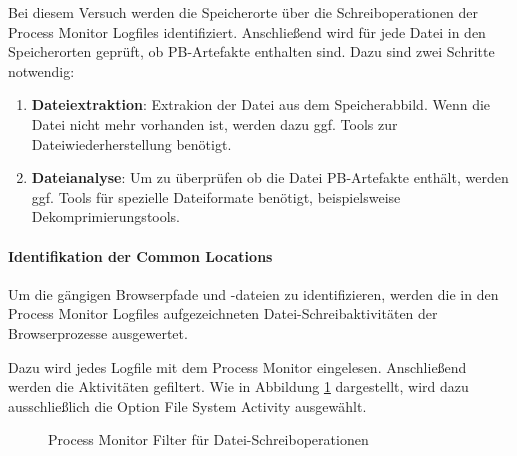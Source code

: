 Bei diesem Versuch werden die Speicherorte über die Schreiboperationen der Process Monitor Logfiles identifiziert.
Anschließend wird für jede Datei in den Speicherorten geprüft, ob PB-Artefakte enthalten sind.
Dazu sind zwei Schritte notwendig:
\begin{enumerate}
\item \textbf{Dateiextraktion}: Extrakion der Datei aus dem Speicherabbild. Wenn die Datei nicht mehr vorhanden ist, werden dazu ggf. Tools zur Dateiwiederherstellung benötigt.
\item \textbf{Dateianalyse}: Um zu überprüfen ob die Datei PB-Artefakte enthält, werden ggf. Tools für spezielle Dateiformate benötigt, beispielsweise Dekomprimierungstools.
\end{enumerate}

\paragraph*{Identifikation der Common Locations}
Um die gängigen Browserpfade und -dateien zu identifizieren, werden die in den Process Monitor Logfiles aufgezeichneten Datei-Schreibaktivitäten der Browserprozesse ausgewertet.

Dazu wird jedes Logfile mit dem Process Monitor eingelesen. Anschließend werden die Aktivitäten gefiltert. Wie in Abbildung \ref{img:procmon-writefile-filter} dargestellt, wird dazu ausschließlich die Option \glqq{}File System Activity\grqq{} ausgewählt.
\begin{figure}[h!]
	\centerline{}
	\caption{Process Monitor Filter für Datei-Schreiboperationen}
	\label{img:procmon-writefile-filter}
\end{figure}

